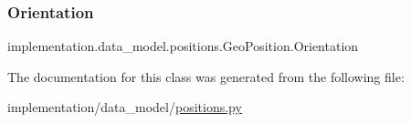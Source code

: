 \subsubsection{\texorpdfstring{Orientation}{Orientation}}
{\footnotesize\ttfamily implementation.\+data\+\_\+model.\+positions.\+Geo\+Position.\+Orientation\hspace{0.3cm}{\ttfamily [static]}}



The documentation for this class was generated from the following file\+:\begin{DoxyCompactItemize}
\item 
implementation/data\+\_\+model/\hyperlink{positions_8py}{positions.\+py}\end{DoxyCompactItemize}
